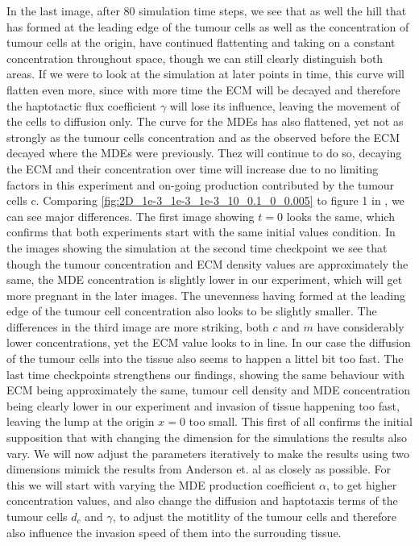 In the last image, after 80 simulation time steps, we see that as well the hill that has formed at the leading edge of the tumour cells as well as the concentration of tumour cells at the origin, have continued flattenting and taking on a constant concentration throughout space, though we can still clearly distinguish both areas. If we were to look at the simulation at later points in time, this curve will flatten even more, since with more time the ECM will be decayed and therefore the haptotactic flux coefficient $\gamma$ will lose its influence, leaving the movement of the cells to diffusion only. The curve for the MDEs has also flattened, yet not as strongly as the tumour cells concentration and as the observed before the ECM decayed where the MDEs were previously. Thez will continue to do so, decaying the ECM and their concentration over time will increase due to no limiting factors in this experiment and on-going production contributed by the tumour cells c.\newline
Comparing \ref{fig:2D_1e-3_1e-3_1e-3_10_0.1_0_0.005} to figure 1 in \cite{anderson_mathematical_2000}, we can see major differences. The first image showing $t=0$ looks the same, which confirms that both experiments start with the same initial values condition. In the images showing the simulation at the second time checkpoint we see that though the tumour concentration and ECM density values are approximately the same, the MDE concentration is slightly lower in our experiment, which will get more pregnant in the later images. The unevenness having formed at the leading edge of the tumour cell concentration also looks to be slightly smaller. The differences in the third image are more striking, both $c$ and $m$ have considerably lower concentrations, yet the ECM value looks to in line. In our case the diffusion of the tumour cells into the tissue also seems to happen a littel bit too fast. The last time checkpoints strengthens our findings, showing the same behaviour with ECM being approximately the same, tumour cell density and MDE concentration being clearly lower in our experiment and invasion of tissue happening too fast, leaving the lump at the origin $x=0$ too small. \newline 
This first of all confirms the initial supposition that with changing the dimension for the simulations the results also vary. We will now adjust the parameters iteratively to make the results using two dimensions mimick the results from Anderson et. al as closely as possible. For this we will start with varying the MDE production coefficient $\alpha$, to get higher concentration values, and also change the diffusion and haptotaxis terms of the tumour cells $d_c$ and  $\gamma$, to adjust the motitlity of the tumour cells and therefore also influence the invasion speed of them into the surrouding tissue.

